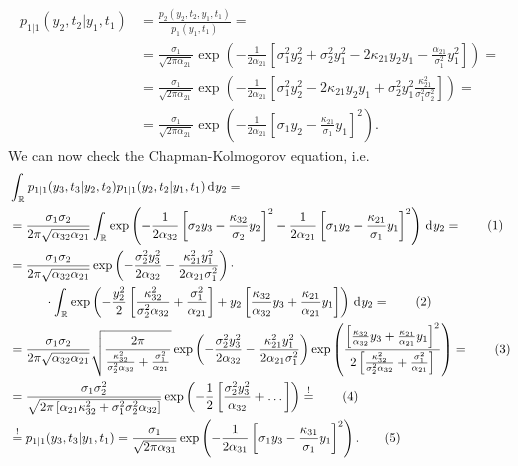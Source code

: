 \documentclass[english, parskip=full]{scrartcl}
\newcommand\numberthis{\addtocounter{equation}{1}\tag{\theequation}}
\newcommand{\intr}{}
\newcommand{\kla}{}
\newcommand{\klam}{}
\begin{document}
\begin{align}
p_{1|1}(y_2,t_2|y_1,t_1) &= \frac{p_2(y_2,t_2,y_1,t_1)}{p_1(y_1,t_1)} = \\
&= \frac{\sigma_1}{\sqrt{2\pi\alpha_{21}}} \exp\kla\left( -\frac{1}{2\alpha_{21}}\klam\left[ \sigma_1^2y_2^2 + \sigma_2^2y_1^2 - 2\kappa_{21}y_2y_1 - \frac{\alpha_{21}}{\sigma_1^2}y_1^2 \right] \right) = \\
&= \frac{\sigma_1}{\sqrt{2\pi\alpha_{21}}} \exp\kla\left( -\frac{1}{2\alpha_{21}}\klam\left[ \sigma_1^2y_2^2 - 2\kappa_{21}y_2y_1 + \sigma_2^2y_1^2\frac{\kappa_{21}^2}{\sigma_1^2\sigma_2^2} \right] \right) =  \\
&= \frac{\sigma_1}{\sqrt{2\pi\alpha_{21}}} \exp\kla\left( -\frac{1}{2\alpha_{21}}\klam\left[ \sigma_1y_2 - \frac{\kappa_{21}}{\sigma_1}y_1 \right]^2 \right).
\end{align}
We can now check the Chapman-Kolmogorov equation, i.e.
\begin{align*}
&\intr\int_{\mathbb{R}^{ }} p_{1|1}(y_3,t_3|y_2,t_2)p_{1|1}(y_2,t_2|y_1,t_1) \, \mathrm{d}^{ }y_2 =  \\
&= \frac{\sigma_1\sigma_2}{2\pi\sqrt{\alpha_{32}\alpha_{21}}} \intr\int_{\mathbb{R}^{ }} \exp\kla\left( -\frac{1}{2\alpha_{32}}\klam\left[ \sigma_2y_3 - \frac{\kappa_{32}}{\sigma_2}y_2 \right]^2 -\frac{1}{2\alpha_{21}}\klam\left[ \sigma_1y_2 - \frac{\kappa_{21}}{\sigma_1}y_1 \right]^2 \right) \, \mathrm{d}^{ }y_2 =  \numberthis \\
&= \frac{\sigma_1\sigma_2}{2\pi\sqrt{\alpha_{32}\alpha_{21}}} \exp\kla\left( -\frac{\sigma_2^2y_3^2}{2\alpha_{32}}-\frac{\kappa_{21}^2y_1^2}{2\alpha_{21}\sigma_1^2} \right) \cdot\\
&\hspace{1cm} \cdot \intr\int_{\mathbb{R}^{ }} \exp\kla\left( -\frac{y_2^2}{2}\klam\left[ \frac{\kappa_{32}^2}{\sigma_2^2\alpha_{32}} + \frac{\sigma_1^2}{\alpha_{21}} \right] + y_2\klam\left[ \frac{\kappa_{32}}{\alpha_{32}}y_3 + \frac{\kappa_{21}}{\alpha_{21}}y_1 \right] \right) \, \mathrm{d}^{ }y_2 =  \numberthis \\
&= \frac{\sigma_1\sigma_2}{2\pi\sqrt{\alpha_{32}\alpha_{21}}}\sqrt{\frac{2\pi}{\frac{\kappa_{32}^2}{\sigma_2^2\alpha_{32}} + \frac{\sigma_1^2}{\alpha_{21}} }}\exp\kla\left( -\frac{\sigma_2^2y_3^2}{2\alpha_{32}}-\frac{\kappa_{21}^2y_1^2}{2\alpha_{21}\sigma_1^2} \right) \exp\kla\left( \frac{\left[ \frac{\kappa_{32}}{\alpha_{32}}y_3 + \frac{\kappa_{21}}{\alpha_{21}}y_1  \right]^2}{2\left[ \frac{\kappa_{32}^2}{\sigma_2^2\alpha_{32}} + \frac{\sigma_1^2}{\alpha_{21}} \right]} \right) = \numberthis\\
&= \frac{\sigma_1\sigma_2^2}{\sqrt{2\pi\klam\left[ \alpha_{21}\kappa_{32}^2 + \sigma_1^2\sigma_2^2\alpha_{32} \right]} } \exp\kla\left( -\frac{1}{2}\klam\left[ \frac{\sigma_2^2y_3^2}{\alpha_{32}}+ \dots \right] \right)  \overset{!}{=} \numberthis  \\
&\overset{!}{=} p_{1|1}(y_3,t_3|y_1,t_1) = \frac{\sigma_1}{\sqrt{2\pi\alpha_{31}}} \exp\kla\left( -\frac{1}{2\alpha_{31}}\klam\left[ \sigma_1y_3 - \frac{\kappa_{31}}{\sigma_1}y_1 \right]^2 \right). \numberthis
\end{align*}
\end{document}
